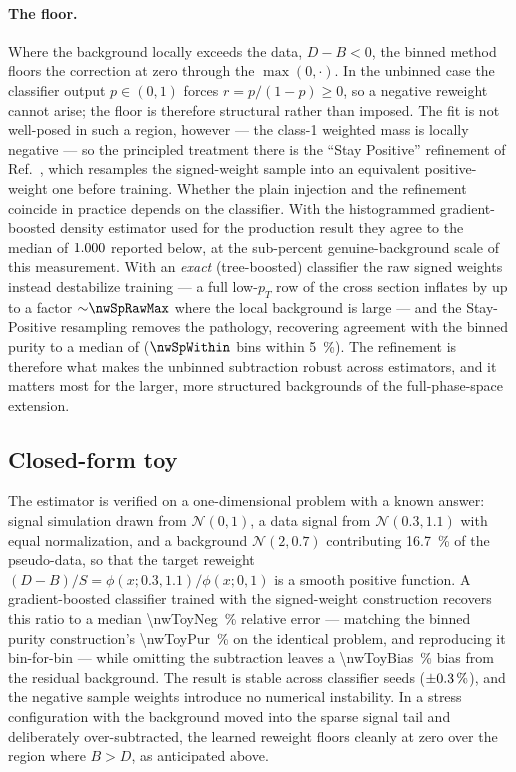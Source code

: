 \paragraph{The floor.} Where the background locally exceeds the data,
$D-B<0$, the binned method floors the correction at zero through the
$\max(0,\cdot)$. In the unbinned case the classifier output $p\in(0,1)$ forces
$r=p/(1-p)\ge 0$, so a negative reweight cannot arise; the floor is therefore
structural rather than imposed. The fit is not well-posed in such a region,
however --- the class-1 weighted mass is locally negative --- so the principled
treatment there is the ``Stay Positive'' refinement of
Ref.~\cite{Nachman:2025staypositive}, which resamples the signed-weight sample
into an equivalent positive-weight one before training. Whether the plain
injection and the refinement coincide in practice depends on the classifier.
With the histogrammed gradient-boosted density estimator used for the
production result they agree to the median of $1.000$ reported below, at
the sub-percent genuine-background scale of this measurement. With an
\emph{exact} (tree-boosted) classifier the raw signed weights instead
destabilize training --- a full low-$p_T$ row of the cross section inflates by
up to a factor ${\sim}\nwSpRawMax$ where the local background is large --- and
the Stay-Positive resampling removes the pathology, recovering agreement with
the binned purity to a median of \nwSpMedian{} ($\nwSpWithin$ bins within
\SI{5}{\percent}). The refinement is therefore what makes the unbinned
subtraction robust across estimators, and it matters most for the larger, more
structured backgrounds of the full-phase-space extension.

\subsection{Closed-form toy}
\label{sec:negweight-toy}

The estimator is verified on a one-dimensional problem with a known answer:
signal simulation drawn from $\mathcal{N}(0,1)$, a data signal from
$\mathcal{N}(0.3,1.1)$ with equal normalization, and a background
$\mathcal{N}(2,0.7)$ contributing \SI{16.7}{\percent} of the pseudo-data, so
that the target reweight $(D-B)/S=\phi(x;0.3,1.1)/\phi(x;0,1)$ is a smooth
positive function. A gradient-boosted classifier trained with the signed-weight
construction recovers this ratio to a median \SI{\nwToyNeg}{\percent} relative
error --- matching the binned purity construction's \SI{\nwToyPur}{\percent} on
the identical problem, and reproducing it bin-for-bin --- while omitting the
subtraction leaves a \SI{\nwToyBias}{\percent} bias from the residual
background. The result is stable across classifier seeds
($\pm\SI{0.3}{\percent}$), and the negative sample weights introduce no
numerical instability. In a stress configuration with the background moved into
the sparse signal tail and deliberately over-subtracted, the learned reweight
floors cleanly at zero over the region where $B>D$, as anticipated above.

